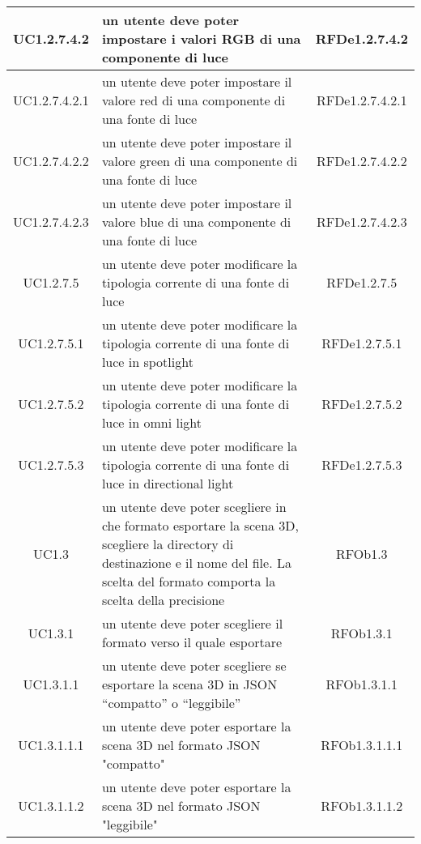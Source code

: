 \begin{longtable}{|c|p{7cm}|c|}
\midrule
UC1.2.7.4.2
& un utente deve poter impostare i valori RGB di una componente di luce
& RFDe1.2.7.4.2 \\


\midrule
UC1.2.7.4.2.1
& un utente deve poter impostare il valore red di una componente di una fonte di luce
& RFDe1.2.7.4.2.1 \\


\midrule
UC1.2.7.4.2.2
& un utente deve poter impostare il valore green di una componente di una fonte di luce
& RFDe1.2.7.4.2.2 \\


\midrule
UC1.2.7.4.2.3
& un utente deve poter impostare il valore blue di una componente di una fonte di luce
& RFDe1.2.7.4.2.3 \\


\midrule
UC1.2.7.5
& un utente deve poter modificare la tipologia corrente di una fonte di luce
& RFDe1.2.7.5 \\


\midrule
UC1.2.7.5.1
& un utente deve poter modificare la tipologia corrente di una fonte di luce in spotlight
& RFDe1.2.7.5.1 \\


\midrule
UC1.2.7.5.2
& un utente deve poter modificare la tipologia corrente di una fonte di luce in omni light
& RFDe1.2.7.5.2 \\


\midrule
UC1.2.7.5.3
& un utente deve poter modificare la tipologia corrente di una fonte di luce in directional light
& RFDe1.2.7.5.3 \\


\midrule
UC1.3
& un utente deve poter scegliere in che formato esportare la scena 3D, scegliere la directory di destinazione e il nome del file. La scelta del formato comporta la scelta della precisione
& RFOb1.3 \\


\midrule
UC1.3.1
& un utente deve poter scegliere il formato verso il quale esportare
& RFOb1.3.1 \\


\midrule
UC1.3.1.1
& un utente deve poter scegliere se esportare la scena 3D in JSON “compatto” o “leggibile”
& RFOb1.3.1.1 \\


\midrule
UC1.3.1.1.1
& un utente deve poter esportare la scena 3D nel formato JSON "compatto"
& RFOb1.3.1.1.1 \\


\midrule
UC1.3.1.1.2
& un utente deve poter esportare la scena 3D nel formato JSON "leggibile"
& RFOb1.3.1.1.2 \\



\end{longtable}
